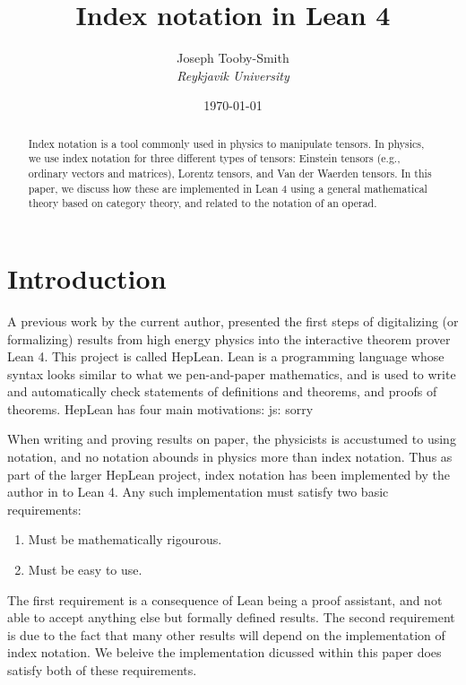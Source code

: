 \documentclass[a4paper, 11pt]{article}
\title{Index notation in Lean 4}
\author{Joseph Tooby-Smith \\ \textit{Reykjavik University}}
\date{\today}
\newcommand{\js}[1]{ {\color{magenta} js:  #1}}
\begin{document}
\maketitle
\vspace{-1cm}
\begin{abstract}
Index notation is a tool commonly used in physics to manipulate tensors.
In physics, we use index notation for three different types of tensors: 
Einstein tensors (e.g., ordinary vectors and matrices), Lorentz tensors, and 
Van der Waerden tensors. In this paper, we discuss how these are implemented in Lean 4 using a 
general mathematical theory based on category theory, and related to the notation of an operad.
\end{abstract}

\section{Introduction}

A previous work by the current author, presented the first steps of digitalizing (or formalizing)
results from high energy physics into the interactive theorem prover Lean 4. This 
project is called HepLean. Lean is a programming language whose syntax looks similar to 
what we pen-and-paper mathematics, and is used to write and automatically check 
 statements of definitions and theorems, and proofs of theorems.
HepLean has four main motivations: \js{sorry}


When writing and proving results on paper, the physicists is accustumed to using notation, and no
notation abounds in physics more than index notation.
Thus as part of the larger HepLean project, index notation has been implemented by 
the author in to Lean 4.
Any such implementation must satisfy two basic requirements: 
\begin{enumerate}
  \item Must be mathematically rigourous. 
  \item Must be easy to use.
\end{enumerate} 
The first requirement is a consequence of Lean being a proof assistant, and not able to accept 
anything else but formally defined results. 
The second requirement is due to the fact that many other results will depend on the 
implementation of index notation. We beleive the implementation dicussed within this paper 
does satisfy both of these requirements.  
\end{document}
